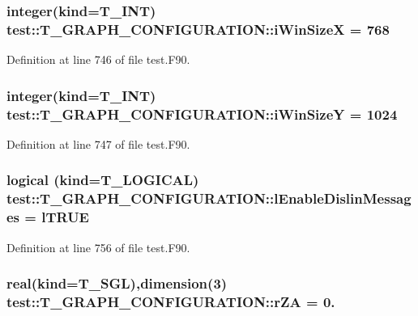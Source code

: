 \hypertarget{typetest_1_1_t___g_r_a_p_h___c_o_n_f_i_g_u_r_a_t_i_o_n_ad37a59914769728f77636dd0ef09e858}{
\subsubsection[{iWinSizeX}]{\setlength{\rightskip}{0pt plus 5cm}integer(kind={\bf T\_\-INT}) {\bf test::T\_\-GRAPH\_\-CONFIGURATION::iWinSizeX} = 768}}
\label{typetest_1_1_t___g_r_a_p_h___c_o_n_f_i_g_u_r_a_t_i_o_n_ad37a59914769728f77636dd0ef09e858}


Definition at line 746 of file test.F90.

\hypertarget{typetest_1_1_t___g_r_a_p_h___c_o_n_f_i_g_u_r_a_t_i_o_n_abd48864ef06ee6daa0e7d98623d3907f}{
\subsubsection[{iWinSizeY}]{\setlength{\rightskip}{0pt plus 5cm}integer(kind={\bf T\_\-INT}) {\bf test::T\_\-GRAPH\_\-CONFIGURATION::iWinSizeY} = 1024}}
\label{typetest_1_1_t___g_r_a_p_h___c_o_n_f_i_g_u_r_a_t_i_o_n_abd48864ef06ee6daa0e7d98623d3907f}


Definition at line 747 of file test.F90.

\hypertarget{typetest_1_1_t___g_r_a_p_h___c_o_n_f_i_g_u_r_a_t_i_o_n_a92607d0a6e1ade6e279dfacd16d69b41}{
\subsubsection[{lEnableDislinMessages}]{\setlength{\rightskip}{0pt plus 5cm}logical (kind={\bf T\_\-LOGICAL}) {\bf test::T\_\-GRAPH\_\-CONFIGURATION::lEnableDislinMessages} = {\bf lTRUE}}}
\label{typetest_1_1_t___g_r_a_p_h___c_o_n_f_i_g_u_r_a_t_i_o_n_a92607d0a6e1ade6e279dfacd16d69b41}


Definition at line 756 of file test.F90.

\hypertarget{typetest_1_1_t___g_r_a_p_h___c_o_n_f_i_g_u_r_a_t_i_o_n_a8ebfb43608409ca54b2cd6ca450403e1}{
\subsubsection[{rZA}]{\setlength{\rightskip}{0pt plus 5cm}real(kind={\bf T\_\-SGL}),dimension(3) {\bf test::T\_\-GRAPH\_\-CONFIGURATION::rZA} = 0.}}
\label{typetest_1_1_t___g_r_a_p_h___c_o_n_f_i_g_u_r_a_t_i_o_n_a8ebfb43608409ca54b2cd6ca450403e1}


